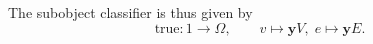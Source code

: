 The subobject classifier is thus given by
\[ \text{true} : 1 \to \Omega, \qquad v \mapsto \mathbf{y}V, \; e \mapsto \mathbf{y}E. \]

